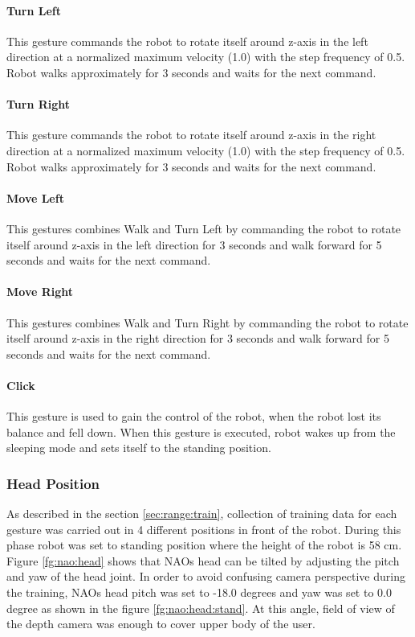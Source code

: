 \paragraph*{Turn Left} This gesture commands the robot to rotate itself around z-axis in the left direction at a normalized maximum velocity (1.0) with the step frequency of 0.5. Robot walks approximately for 3 seconds and waits for the next command.

\paragraph*{Turn Right} This gesture commands the robot to rotate itself around z-axis in the right direction at a normalized maximum velocity (1.0) with the step frequency of 0.5. Robot walks approximately for 3 seconds and waits for the next command.

\paragraph*{Move Left} This gestures combines Walk and Turn Left by commanding the robot to rotate itself around z-axis in the left direction for 3 seconds and walk forward for 5 seconds and waits for the next command.

\paragraph*{Move Right}  This gestures combines Walk and Turn Right by commanding the robot to rotate itself around z-axis in the right direction for 3 seconds and walk forward for 5 seconds and waits for the next command.

\paragraph*{Click} This gesture is used to gain the control of the robot, when the robot lost its balance and fell down. When this gesture is executed, robot wakes up from the sleeping mode and sets itself to the standing position.



\subsubsection*{Head Position} As described in the section \ref{sec:range:train}, collection of training data for each gesture was carried out in 4 different positions in front of the robot. During this phase robot was set to standing position where the height of the robot is 58 cm. Figure \ref{fg:nao:head} shows that NAOs head can be tilted by adjusting the pitch and yaw of the head joint. In order to avoid confusing camera perspective during the training, NAOs head pitch was set to -18.0 degrees and yaw was set to 0.0 degree as shown in the figure \ref{fg:nao:head:stand}. At this angle, field of view of the depth camera was enough to cover upper body of the user. 

